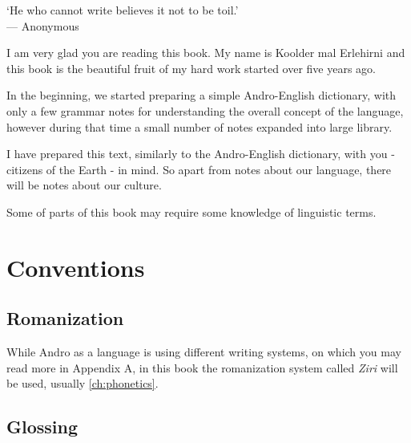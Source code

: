 \begin{center}\small
`He who cannot write believes it not to be toil.'\\
--- Anonymous\footnotemark
\end{center}\bigskip


 I am very glad you are reading this book. My name is
Koolder mal Erlehirni and this book is the beautiful fruit of my hard work
started over five years ago.

In the beginning, we started preparing a simple Andro-English dictionary, with
only a few grammar notes for understanding the overall concept of the language,
however during that time a small number of notes expanded into large library.

I have prepared this text, similarly to the Andro-English dictionary, with you -
citizens of the Earth - in mind. So apart from notes about our language, there
will be notes about our culture.

Some of parts of this book may require some knowledge of linguistic terms.

\bigskip


\section{Conventions}

\subsection{Romanization}

While Andro as a language is using different writing systems, on which you may
read more in Appendix A, in this book the romanization system called
\textit{Ziri} will be used, usually \ref{ch:phonetics}.

\subsection{Glossing}

